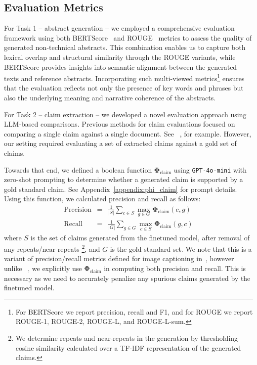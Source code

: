 \documentclass[11pt]{article}
\begin{document}
\subsection{Evaluation Metrics}

For Task 1 -- abstract generation -- we employed a comprehensive evaluation framework using both BERTScore~\cite{zhang2020bertscore} and ROUGE~\cite{lin-2004-rouge} metrics to assess the quality of generated non-technical abstracts. This combination enables us to capture both lexical overlap and structural similarity through the ROUGE variants, while BERTScore provides insights into semantic alignment between the generated texts and reference abstracts. Incorporating such multi-viewed metrics\footnote{For BERTScore we report precision, recall and F1, and for ROUGE we report ROUGE-1, ROUGE-2, ROUGE-L, and ROUGE-L-sum.} ensures that the evaluation reflects not only the presence of key words and phrases but also the underlying meaning and narrative coherence of the abstracts.

For Task 2 -- claim extraction -- we developed a novel evaluation approach using LLM-based comparisons. Previous methods for claim evaluations focused on comparing a single claim against a single document. See ~\citet{tang-etal-2024-minicheck}, for example. However, our setting required evaluating a set of extracted claims against a gold set of claims.


Towards that end, we defined a boolean function $\mathbf{\Phi}_{\textrm{claim}}$ using \texttt{GPT-4o-mini} with zero-shot prompting to determine whether a generated claim is supported by a gold standard claim. See Appendix~\ref{appendix:phi_claim} for prompt details. Using this function, we calculated precision and recall as follows:
\begin{equation*}
\left.\begin{aligned}
\text{Precision}&=&\frac{1}{|S|} \sum_{c \in S} \max_{g \in G} \mathbf{\Phi}_{\textrm{claim}}(c, g)\\
\text{Recall}&=&\frac{1}{|G|} \sum_{g \in G} \max_{c \in S} \mathbf{\Phi}_{\textrm{claim}}(g, c)
\end{aligned}\right.
\end{equation*}
\noindent where $S$ is the set of claims generated from the finetuned model, after removal of any repeats/near-repeats
\footnote{We determine repeats and near-repeats in the generation by thresholding cosine similarity calculated over a TF-IDF representation of the generated claims.},
 and $G$ is the gold standard set. We note that this is a variant of precision/recall metrics defined for image captioning in~\cite{deitke2024molmo}, however unlike ~\citeauthor{deitke2024molmo}, we explicitly use $\mathbf{\Phi}_{\textrm{claim}}$ in computing both precision and recall. This is necessary as we need to accurately penalize any spurious claims generated by the finetuned model.
\end{document}
